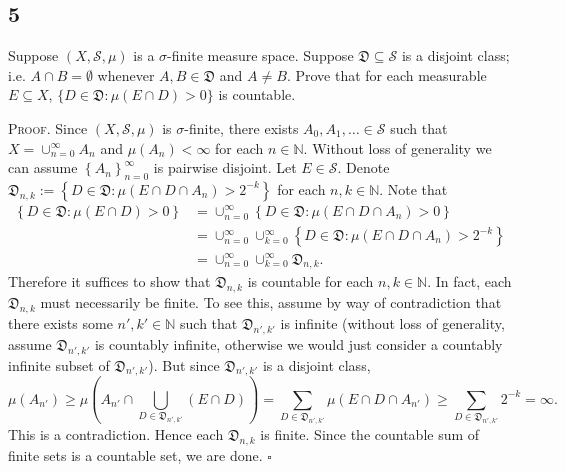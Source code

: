 \documentclass[12pt]{article}
\newcounter{ProofCounter}
\newenvironment{Proof}{\stepcounter{ProofCounter}\textsc{Proof.}}{\hfill$\square$}
\begin{document}
\subsection*{5}
\begin{tcolorbox}
Suppose $(X, \mathcal{S}, \mu)$ is a $\sigma$-finite measure space. Suppose $\mathfrak{D} \subseteq \mathcal{S}$ is a disjoint class; i.e. $A\cap B = \emptyset$
whenever $A, B \in \mathfrak{D}$ and $A \neq B$. Prove that for each measurable $E \subseteq X$, $\{D \in \mathfrak{D} : \mu(E\cap D) > 0\}$ is
countable.
\end{tcolorbox}

\begin{Proof}
Since $(X, \mathcal{S}, \mu)$ is $\sigma$-finite, there exists $A_{0}, A_{1}, \hdots \in \mathcal{S}$ such that $X = \cup_{n=0}^{\infty}A_{n}$ and
$\mu(A_{n}) < \infty$ for each $n \in \mathbb{N}$. Without loss of generality we can assume $\left\{ A_{n} \right\}_{n=0}^{\infty}$ is pairwise
disjoint. Let $E \in \mathcal{S}$. Denote $\mathfrak{D}_{n,k} := \left\{ D \in \mathfrak{D} : \mu(E\cap D\cap A_{n}) > 2^{-k} \right\}$ for each $n,k
\in \mathbb{N}$. Note that 
\begin{align*}
\left\{ D \in \mathfrak{D} : \mu(E \cap D) > 0 \right\} & = \cup_{n=0}^{\infty}\left\{ D \in \mathfrak{D} : \mu(E\cap D\cap A_{n}) > 0 \right\} \\
& = \cup_{n=0}^{\infty}\cup_{k=0}^{\infty}\left\{ D \in \mathfrak{D} : \mu(E\cap D\cap A_{n}) > 2^{-k} \right\} \\
& = \cup_{n=0}^{\infty}\cup_{k=0}^{\infty}\mathfrak{D}_{n,k}.
\end{align*}
Therefore it suffices to show that $\mathfrak{D}_{n,k}$ is countable for each $n,k \in \mathbb{N}$. In fact, each $\mathfrak{D}_{n,k}$ must
necessarily be finite. To see this, assume by way of contradiction that there exists some $n', k' \in \mathbb{N}$ such that $\mathfrak{D}_{n',k'}$ is
infinite (without loss of generality, assume $\mathfrak{D}_{n',k'}$ is countably infinite, otherwise we would just consider a countably infinite
subset of $\mathfrak{D}_{n',k'}$). But since $\mathfrak{D}_{n',k'}$ is a disjoint class, 
\[ \mu(A_{n'}) \geq \mu\left(A_{n'}\cap \bigcup_{D\in\mathfrak{D}_{n',k'}}(E\cap D)\right) = \sum_{D\in \mathfrak{D}_{n',k'}}\mu(E\cap D\cap A_{n'}) 
\geq \sum_{D\in\mathfrak{D}_{n',k'}}2^{-k} = \infty. \]
This is a contradiction. Hence each $\mathfrak{D}_{n,k}$ is finite. Since the countable sum of finite sets is a countable set, we are done.
\end{Proof}
\end{document}
